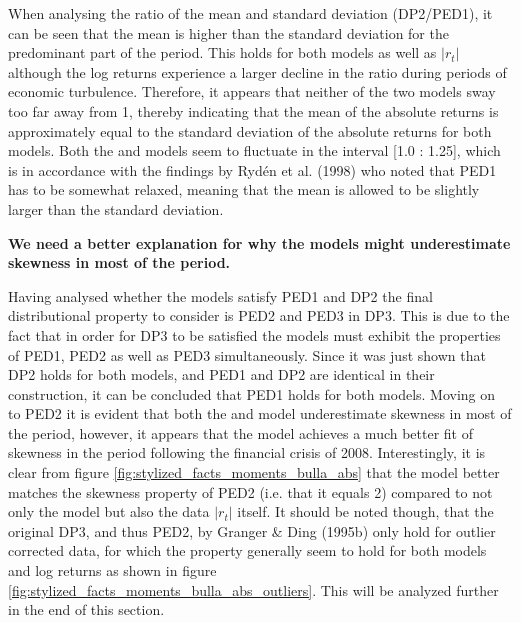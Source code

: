 When analysing the ratio of the mean and standard deviation (DP2/PED1), it can be seen that the mean is higher than the standard deviation for the predominant part of the period. This holds for both models as well as $|r_t|$ although the log returns experience a larger decline in the ratio during periods of economic turbulence. Therefore, it appears that neither of the two models sway too far away from 1, thereby indicating that the mean of the absolute returns is approximately equal to the standard deviation of the absolute returns for both models. Both the \mle and \jump models seem to fluctuate in the interval [1.0 : 1.25], which is in accordance with the findings by Rydén et al. (1998) who noted that PED1 has to be somewhat relaxed, meaning that the mean is allowed to be slightly larger than the standard deviation.

\textbf{We need a better explanation for why the models might underestimate skewness in most of the period.}

Having analysed whether the models satisfy PED1 and DP2 the final distributional property to consider is PED2 and PED3 in DP3. This is due to the fact that in order for DP3 to be satisfied the models must exhibit the properties of PED1, PED2 as well as PED3 simultaneously. Since it was just shown that DP2 holds for both models, and PED1 and DP2 are identical in their construction, it can be concluded that PED1 holds for both models. Moving on to PED2 it is evident that both the \mle and \jump model underestimate skewness in most of the period, however, it appears that the \jump model achieves a much better fit of skewness in the period following the financial crisis of 2008. Interestingly, it is clear from figure \ref{fig:stylized_facts_moments_bulla_abs} that the \mle model better matches the skewness property of PED2 (i.e. that it equals 2) compared to not only the \jump model but also the data $|r_t|$ itself. It should be noted though, that the original DP3, and thus PED2, by Granger \& Ding (1995b) only hold for outlier corrected data, for which the property generally seem to hold for both models and log returns as shown in figure \ref{fig:stylized_facts_moments_bulla_abs_outliers}. This will be analyzed further in the end of this section. 

